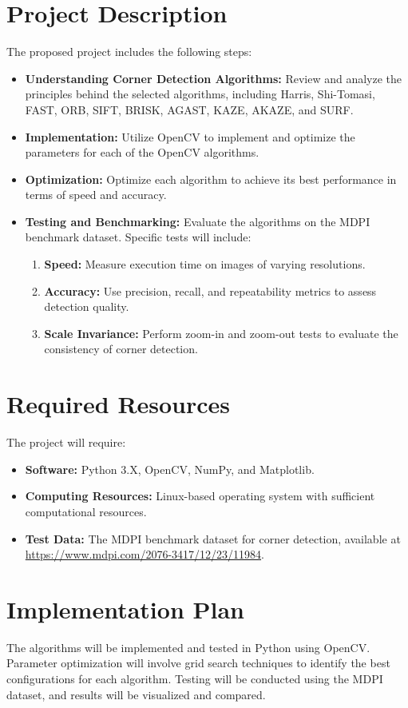 \documentclass[journal]{IEEEtran}
\begin{document}
\section{Project Description}
The proposed project includes the following steps:
\begin{itemize}
    \item \textbf{Understanding Corner Detection Algorithms:} Review and analyze the principles behind the selected algorithms, including Harris, Shi-Tomasi, FAST, ORB, SIFT, BRISK, AGAST, KAZE, AKAZE, and SURF.
    \item \textbf{Implementation:} Utilize OpenCV to implement and optimize the parameters for each of the OpenCV algorithms.
    \item \textbf{Optimization:} Optimize each algorithm to achieve its best performance in terms of speed and accuracy.
    \item \textbf{Testing and Benchmarking:} Evaluate the algorithms on the MDPI benchmark dataset. Specific tests will include:
    \begin{enumerate}
        \item \textbf{Speed:} Measure execution time on images of varying resolutions.
        \item \textbf{Accuracy:} Use precision, recall, and repeatability metrics to assess detection quality.
        \item \textbf{Scale Invariance:} Perform zoom-in and zoom-out tests to evaluate the consistency of corner detection.
    \end{enumerate}
\end{itemize}

\section{Required Resources}
The project will require:
\begin{itemize}
    \item \textbf{Software:} Python 3.X, OpenCV, NumPy, and Matplotlib.
    \item \textbf{Computing Resources:} Linux-based operating system with sufficient computational resources.
    \item \textbf{Test Data:} The MDPI benchmark dataset for corner detection, available at \url{https://www.mdpi.com/2076-3417/12/23/11984}.
\end{itemize}

\section{Implementation Plan}
The algorithms will be implemented and tested in Python using OpenCV. Parameter optimization will involve grid search techniques to identify the best configurations for each algorithm. Testing will be conducted using the MDPI dataset, and results will be visualized and compared.
\end{document}

